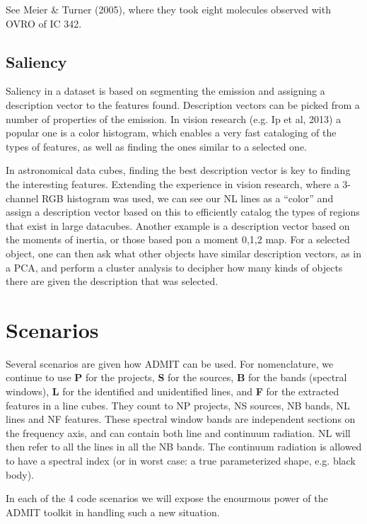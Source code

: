\documentclass[preprint]{aastex} %
\begin{document}
See Meier \& Turner (2005), where they took eight molecules 
observed with OVRO of IC 342.

\subsection{Saliency}

Saliency in a dataset is based on segmenting the emission and assigning
a description vector to the features found. Description vectors can be
picked from a number of properties of the emission. In vision research
(e.g. Ip et al, 2013)
a popular one is a color histogram, which enables a very fast
cataloging of the types of features, as well as finding the ones similar
to a selected one.


In astronomical data cubes, finding the best description vector is key
to finding the interesting features.  Extending the experience in
vision research, where a 3-channel RGB histogram was used, we can see
our NL lines as a ``color'' and assign a description vector based on 
this to efficiently catalog the types of regions that exist in large
datacubes.
Another example is a description
vector based on the moments of inertia, or those based pon a moment
0,1,2 map.  For a selected object, one can then ask what other objects
have similar description vectors, as in a PCA, and perform a cluster
analysis to decipher how many kinds of objects there are given the
description that was selected.



\section{Scenarios}

\label{s:scenarios}

Several scenarios are given how ADMIT can be used.  For nomenclature, we continue
to use {\bf P} for
the projects, {\bf S} for the sources, {\bf B} for the bands (spectral windows), 
{\bf L} for the identified and unidentified lines, and {\bf F} for the extracted
features in a line cubes. They count to 
NP projects, NS sources, NB bands, NL lines and NF features.
These spectral window bands are independent sections on the frequency axis, 
and can contain both line and continuum radiation. NL will then refer to all the
lines in all the NB bands.
The continuum radiation is allowed to have a spectral 
index (or in worst case: a true parameterized shape, e.g. black body).


In each of the 4 code scenarios we will expose the enourmous power of the
ADMIT toolkit in handling such a new situation.
\end{document}
